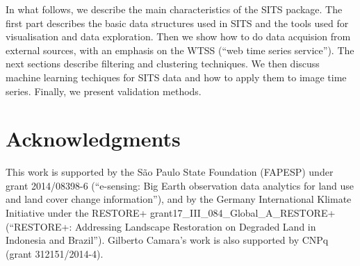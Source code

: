 \documentclass[article,shortnames]{jss}
\begin{document}
In what follows, we describe the main characteristics of the SITS
package. The first part describes the basic data structures used in SITS
and the tools used for visualisation and data exploration. Then we show
how to do data acquision from external sources, with an emphasis on the
WTSS (``web time series service''). The next sections describe filtering
and clustering techniques. We then discuss machine learning techiques
for SITS data and how to apply them to image time series. Finally, we
present validation methods.

\section*{Acknowledgments}

This work is supported by the São Paulo State Foundation (FAPESP) under
grant 2014/08398-6 (``e-sensing: Big Earth observation data analytics
for land use and land cover change information''), and by the Germany
International Klimate Initiative under the RESTORE+
grant17\_III\_084\_Global\_A\_RESTORE+ (``RESTORE+: Addressing Landscape
Restoration on Degraded Land in Indonesia and Brazil''). Gilberto
Camara's work is also supported by CNPq (grant 312151/2014-4).


\end{document}
